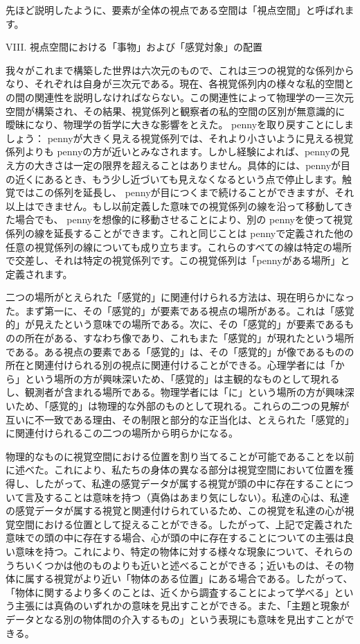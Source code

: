 \documentclass[a4paper,11pt,openany]{ltjsbook}
\begin{document}
先ほど説明したように、要素が全体の視点である空間は「視点空間」と呼ばれます。

 VIII. 視点空間における「事物」および「感覚対象」の配置

我々がこれまで構築した世界は六次元のもので、これは三つの視覚的な係列からなり、それぞれは自身が三次元である。現在、各視覚係列内の様々な私的空間との間の関連性を説明しなければならない。この関連性によって物理学の一三次元空間が構築され、その結果、視覚係列と観察者の私的空間の区別が無意識的に曖昧になり、物理学の哲学に大きな影響をとえた。 pennyを取り戻すことにしましょう： pennyが大きく見える視覚係列では、それより小さいように見える視覚係列よりも pennyの方が近いとみなされます。しかし経験によれば、pennyの見え方の大きさは一定の限界を超えることはありません。具体的には、pennyが目の近くにあるとき、もう少し近づいても見えなくなるという点で停止します。触覚ではこの係列を延長し、 pennyが目につくまで続けることができますが、それ以上はできません。もし以前定義した意味での視覚係列の線を沿って移動してきた場合でも、 pennyを想像的に移動させることにより、別の pennyを使って視覚係列の線を延長することができます。これと同じことは pennyで定義された他の任意の視覚係列の線についても成り立ちます。これらのすべての線は特定の場所で交差し、それは特定の視覚係列です。この視覚係列は「pennyがある場所」と定義されます。

二つの場所がとえられた「感覚的」に関連付けられる方法は、現在明らかになった。まず第一に、その「感覚的」が要素である視点の場所がある。これは「感覚的」が見えたという意味での場所である。次に、その「感覚的」が要素であるものの所在がある、すなわち像であり、これもまた「感覚的」が現れたという場所である。ある視点の要素である「感覚的」は、その「感覚的」が像であるものの所在と関連付けられる別の視点に関連付けることができる。心理学者には「から」という場所の方が興味深いため、「感覚的」は主観的なものとして現れるし、観測者が含まれる場所である。物理学者には「に」という場所の方が興味深いため、「感覚的」は物理的な外部のものとして現れる。これらの二つの見解が互いに不一致である理由、その制限と部分的な正当化は、とえられた「感覚的」に関連付けられるこの二つの場所から明らかになる。

物理的なものに視覚空間における位置を割り当てることが可能であることを以前に述べた。これにより、私たちの身体の異なる部分は視覚空間において位置を獲得し、したがって、私達の感覚データが属する視覚が頭の中に存在することについて言及することは意味を持つ（真偽はあまり気にしない）。私達の心は、私達の感覚データが属する視覚と関連付けられているため、この視覚を私達の心が視覚空間における位置として捉えることができる。したがって、上記で定義された意味での頭の中に存在する場合、心が頭の中に存在することについての主張は良い意味を持つ。これにより、特定の物体に対する様々な現象について、それらのうちいくつかは他のものよりも近いと述べることができる；近いものは、その物体に属する視覚がより近い「物体のある位置」にある場合である。したがって、「物体に関するより多くのことは、近くから調査することによって学べる」という主張には真偽のいずれかの意味を見出すことができる。また、「主題と現象がデータとなる別の物体間の介入するもの」という表現にも意味を見出すことができる。
\end{document}
